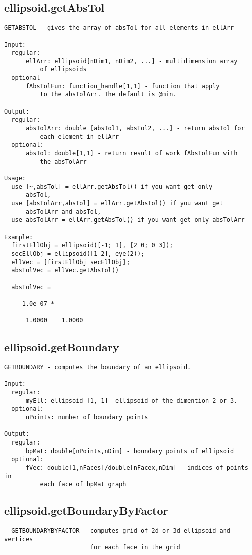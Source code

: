 \subsection{\texorpdfstring{ellipsoid.getAbsTol}{getAbsTol}}\label{method:ellipsoid.getAbsTol}
\begin{verbatim}
GETABSTOL - gives the array of absTol for all elements in ellArr

Input:
  regular:
      ellArr: ellipsoid[nDim1, nDim2, ...] - multidimension array
          of ellipsoids
  optional
      fAbsTolFun: function_handle[1,1] - function that apply
          to the absTolArr. The default is @min.

Output:
  regular:
      absTolArr: double [absTol1, absTol2, ...] - return absTol for
          each element in ellArr
  optional:
      absTol: double[1,1] - return result of work fAbsTolFun with
          the absTolArr

Usage:
  use [~,absTol] = ellArr.getAbsTol() if you want get only
      absTol,
  use [absTolArr,absTol] = ellArr.getAbsTol() if you want get
      absTolArr and absTol,
  use absTolArr = ellArr.getAbsTol() if you want get only absTolArr

Example:
  firstEllObj = ellipsoid([-1; 1], [2 0; 0 3]);
  secEllObj = ellipsoid([1 2], eye(2));
  ellVec = [firstEllObj secEllObj];
  absTolVec = ellVec.getAbsTol()

  absTolVec =

     1.0e-07 *

      1.0000    1.0000
\end{verbatim}
\subsection{\texorpdfstring{ellipsoid.getBoundary}{getBoundary}}\label{method:ellipsoid.getBoundary}
\begin{verbatim}
GETBOUNDARY - computes the boundary of an ellipsoid.

Input:
  regular:
      myEll: ellipsoid [1, 1]- ellipsoid of the dimention 2 or 3.
  optional:
      nPoints: number of boundary points

Output:
  regular:
      bpMat: double[nPoints,nDim] - boundary points of ellipsoid
  optional:
      fVec: double[1,nFaces]/double[nFacex,nDim] - indices of points in
          each face of bpMat graph
\end{verbatim}
\subsection{\texorpdfstring{ellipsoid.getBoundaryByFactor}{getBoundaryByFactor}}\label{method:ellipsoid.getBoundaryByFactor}
\begin{verbatim}
  GETBOUNDARYBYFACTOR - computes grid of 2d or 3d ellipsoid and vertices
                        for each face in the grid
\end{verbatim}
